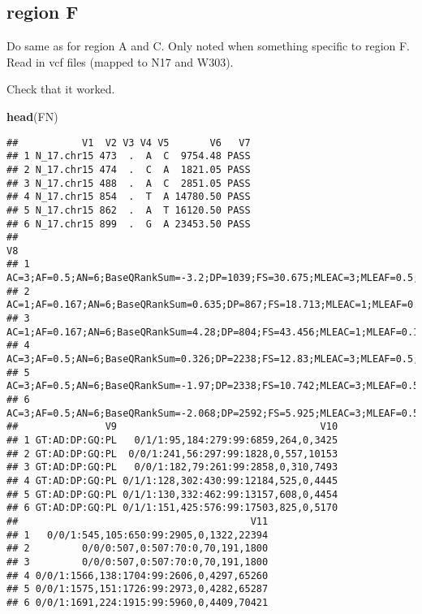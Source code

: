 \documentclass[
]{article}
\newenvironment{Shaded}{\begin{snugshade}}{\end{snugshade}}
\newcommand{\FunctionTok}[1]{\textcolor[rgb]{0.13,0.29,0.53}{\textbf{#1}}}
\newcommand{\NormalTok}[1]{#1}
\begin{document}
\hypertarget{region-f}{%
\subsection{region F}\label{region-f}}

Do same as for region A and C. Only noted when something specific to
region F. Read in vcf files (mapped to N17 and W303).

Check that it worked.

\begin{Shaded}
\begin{Highlighting}[]
\FunctionTok{head}\NormalTok{(FN)}
\end{Highlighting}
\end{Shaded}

\begin{verbatim}
##           V1  V2 V3 V4 V5       V6   V7
## 1 N_17.chr15 473  .  A  C  9754.48 PASS
## 2 N_17.chr15 474  .  C  A  1821.05 PASS
## 3 N_17.chr15 488  .  A  C  2851.05 PASS
## 4 N_17.chr15 854  .  T  A 14780.50 PASS
## 5 N_17.chr15 862  .  A  T 16120.50 PASS
## 6 N_17.chr15 899  .  G  A 23453.50 PASS
##                                                                                                                                            V8
## 1       AC=3;AF=0.5;AN=6;BaseQRankSum=-3.2;DP=1039;FS=30.675;MLEAC=3;MLEAF=0.5;MQ=55.53;MQRankSum=1.8;QD=10.5;ReadPosRankSum=-4.019;SOR=0.079
## 2   AC=1;AF=0.167;AN=6;BaseQRankSum=0.635;DP=867;FS=18.713;MLEAC=1;MLEAF=0.167;MQ=50.1;MQRankSum=-9.369;QD=6.13;ReadPosRankSum=4.74;SOR=1.781
## 3 AC=1;AF=0.167;AN=6;BaseQRankSum=4.28;DP=804;FS=43.456;MLEAC=1;MLEAF=0.167;MQ=50.43;MQRankSum=-10.95;QD=10.92;ReadPosRankSum=-0.03;SOR=1.826
## 4     AC=3;AF=0.5;AN=6;BaseQRankSum=0.326;DP=2238;FS=12.83;MLEAC=3;MLEAF=0.5;MQ=58.48;MQRankSum=-8.245;QD=6.93;ReadPosRankSum=-1.59;SOR=1.013
## 5    AC=3;AF=0.5;AN=6;BaseQRankSum=-1.97;DP=2338;FS=10.742;MLEAC=3;MLEAF=0.5;MQ=58.3;MQRankSum=-8.842;QD=7.37;ReadPosRankSum=-2.342;SOR=0.937
## 6     AC=3;AF=0.5;AN=6;BaseQRankSum=-2.068;DP=2592;FS=5.925;MLEAC=3;MLEAF=0.5;MQ=57.86;MQRankSum=-11.36;QD=9.42;ReadPosRankSum=3.02;SOR=0.442
##               V9                                   V10
## 1 GT:AD:DP:GQ:PL   0/1/1:95,184:279:99:6859,264,0,3425
## 2 GT:AD:DP:GQ:PL  0/0/1:241,56:297:99:1828,0,557,10153
## 3 GT:AD:DP:GQ:PL   0/0/1:182,79:261:99:2858,0,310,7493
## 4 GT:AD:DP:GQ:PL 0/1/1:128,302:430:99:12184,525,0,4445
## 5 GT:AD:DP:GQ:PL 0/1/1:130,332:462:99:13157,608,0,4454
## 6 GT:AD:DP:GQ:PL 0/1/1:151,425:576:99:17503,825,0,5170
##                                        V11
## 1   0/0/1:545,105:650:99:2905,0,1322,22394
## 2         0/0/0:507,0:507:70:0,70,191,1800
## 3         0/0/0:507,0:507:70:0,70,191,1800
## 4 0/0/1:1566,138:1704:99:2606,0,4297,65260
## 5 0/0/1:1575,151:1726:99:2973,0,4282,65287
## 6 0/0/1:1691,224:1915:99:5960,0,4409,70421
\end{verbatim}
\end{document}
